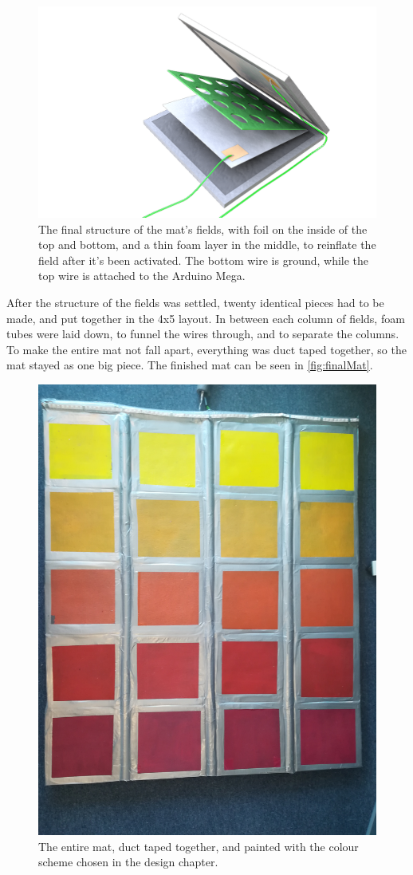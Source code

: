 	\begin{figure}[H]
		\centering
		\includegraphics[width=1\linewidth]{figure/Implementation/Medialogyp4mat}
		\caption{The final structure of the mat's fields, with foil on the inside of the top and bottom, and a thin foam layer in the middle, to reinflate the field after it's been activated. The bottom wire is ground, while the top wire is attached to the Arduino Mega.}
		\label{fig:finalField}
	\end{figure}

	After the structure of the fields was settled, twenty identical pieces had to be made, and put together in the 4x5 layout. In between each column of fields, foam tubes were laid down, to funnel the wires through, and to separate the columns. To make the entire mat not fall apart, everything was duct taped together, so the mat stayed as one big piece. The finished mat can be seen in \autoref{fig:finalMat}.
	\begin{figure}[H]
		\centering
		\includegraphics[width=0.42\linewidth]{figure/Implementation/fullMat}
		\caption{The entire mat, duct taped together, and painted with the colour scheme chosen in the design chapter.}
		\label{fig:finalMat}
	\end{figure}
	

